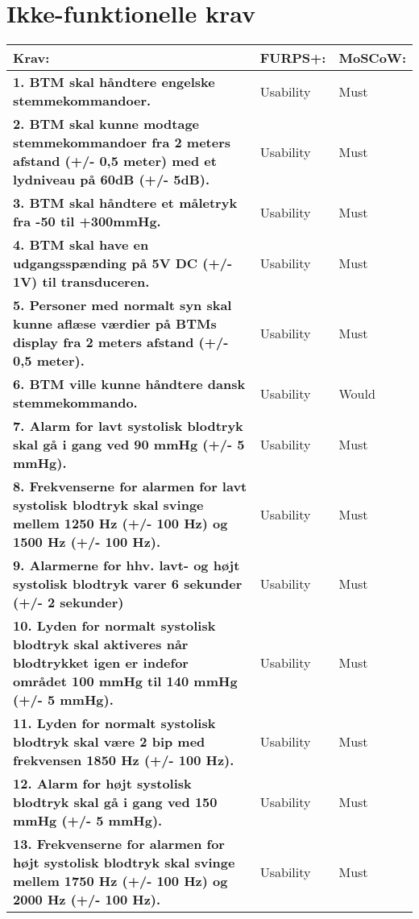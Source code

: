 \chapter{Ikke-funktionelle krav}
\begin{table} [htbp]
\centering
\begin{tabular}{|p{10cm}|l|l|}
\hline
\textbf{Krav:} & \textbf{FURPS+:} & \textbf{MoSCoW:} \\ \hline
\textbf{1. BTM skal håndtere engelske stemmekommandoer. } & Usability & Must \\\hline
\textbf{2. BTM skal kunne modtage stemmekommandoer fra 2 meters afstand (+/- 0,5 meter) med et lydniveau på 60dB (+/- 5dB).} & Usability & Must \\ \hline
\textbf{3. BTM skal håndtere et måletryk fra -50 til +300mmHg. }  & Usability & Must \\ \hline 
\textbf{4. BTM skal have en udgangsspænding på 5V DC (+/- 1V) til transduceren.} & Usability & Must \\ \hline
\textbf{5. Personer med normalt syn skal kunne aflæse værdier på BTMs display fra 2 meters afstand (+/- 0,5 meter). } & Usability & Must \\ \hline
\textbf{6. BTM ville kunne håndtere dansk stemmekommando.} & Usability & Would \\ \hline
\textbf{7. Alarm for lavt systolisk blodtryk skal gå i gang ved 90 mmHg (+/- 5 mmHg).} & Usability & Must \\ \hline
\textbf{8. Frekvenserne for alarmen for lavt systolisk blodtryk skal svinge mellem 1250 Hz (+/- 100 Hz) og 1500 Hz (+/- 100 Hz).} & Usability & Must \\ \hline
\textbf{9. Alarmerne for hhv. lavt- og højt systolisk blodtryk varer 6 sekunder (+/- 2 sekunder)} & Usability & Must \\ \hline
\textbf{10. Lyden for normalt systolisk blodtryk skal aktiveres når blodtrykket igen er indefor området 100 mmHg til 140 mmHg (+/- 5 mmHg).} & Usability & Must \\ \hline
\textbf{11. Lyden for normalt systolisk blodtryk skal være 2 bip med frekvensen 1850 Hz (+/- 100 Hz).} & Usability & Must \\ \hline
\textbf{12. Alarm for højt systolisk blodtryk skal gå i gang ved 150 mmHg (+/- 5 mmHg).} & Usability & Must \\ \hline
\textbf{13. Frekvenserne for alarmen for højt systolisk blodtryk skal svinge mellem 1750 Hz (+/- 100 Hz) og 2000 Hz (+/- 100 Hz).} & Usability & Must \\ \hline

\end{tabular}
\end{table}
